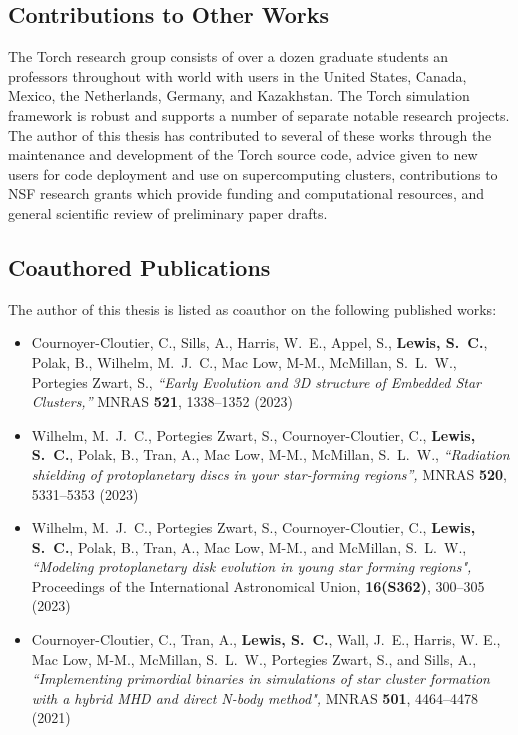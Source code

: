 \documentclass[twoside]{drexel-thesis}
\begin{document}
\begin{thesis}
\section{Contributions to Other Works}

The Torch research group consists of over a dozen graduate students an professors throughout with world with users in the United States, Canada, Mexico, the Netherlands, Germany, and Kazakhstan. The Torch simulation framework is robust and supports a number of separate notable research projects. The author of this thesis has contributed to several of these works through the maintenance and development of the Torch source code, advice given to new users for code deployment and use on supercomputing clusters, contributions to NSF research grants which provide funding and computational resources, and general scientific review of preliminary paper drafts.
\subsection{Coauthored Publications}
The author of this thesis is listed as coauthor on the following published works:
\begin{itemize}
    \item {Cournoyer-Cloutier}, C., {Sills}, A., {Harris}, W.~E., {Appel}, S., \textbf{{Lewis}, S.~C.}, {Polak}, B., {Wilhelm}, M.~J.~C., {Mac Low}, M-M., {McMillan}, S.~L.~W., {Portegies Zwart}, S., \textit{``Early Evolution and 3D structure of Embedded Star Clusters,''} MNRAS \textbf{521}, 1338--1352 (2023)
    \item {Wilhelm}, M.~J.~C., {Portegies Zwart}, S., {Cournoyer-Cloutier}, C., \textbf{{Lewis}, S.~C.}, {Polak}, B., {Tran}, A., {Mac Low}, M-M., {McMillan}, S.~L.~W., \textit{``Radiation shielding of protoplanetary discs in your star-forming regions'',} MNRAS \textbf{520}, 5331--5353 (2023)
    \item {Wilhelm}, M.~J.~C., {Portegies Zwart}, S., {Cournoyer-Cloutier}, C., \textbf{{Lewis}, S.~C.}, {Polak}, B., {Tran}, A., {Mac Low}, M-M., and {McMillan}, S.~L.~W., \textit{``Modeling protoplanetary disk evolution in young star forming regions",} Proceedings of the International Astronomical Union, \textbf{16(S362)}, 300--305 (2023)
    \item {Cournoyer-Cloutier}, C., {Tran}, A., \textbf{{Lewis}, S.~C.}, {Wall}, J.~E., {Harris}, W. E., {Mac Low}, M-M., {McMillan}, S.~L.~W., {Portegies Zwart}, S., and {Sills}, A., \textit{``Implementing primordial binaries in simulations of star cluster formation with a hybrid MHD and direct N-body method",} MNRAS \textbf{501}, 4464--4478 (2021) %
\end{itemize}


\end{thesis}
\end{document}
